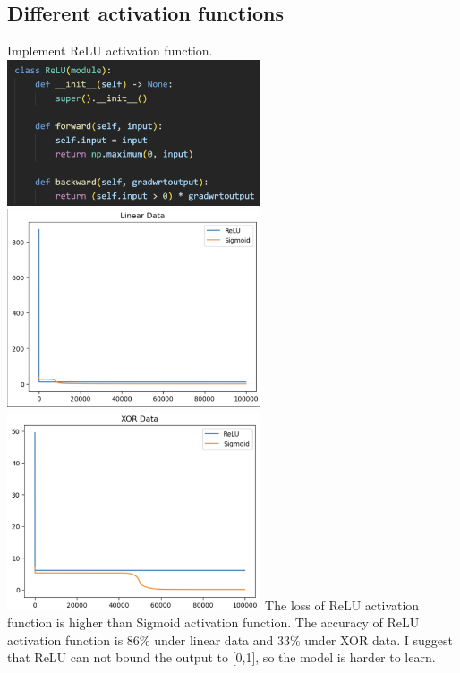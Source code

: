 \documentclass{article} %
\begin{document}
    \subsection{Different activation functions}
    Implement ReLU activation function. \\
    \includegraphics[width=7.5cm]{./imgs/relu.png} \\
    \includegraphics[width=7.5cm]{./imgs/linear_relu_loss.png}
    \includegraphics[width=7.5cm]{./imgs/xor_relu_loss.png}
    The loss of ReLU activation function is higher than Sigmoid activation function. 
    The accuracy of ReLU activation function is 86\% under linear data and 33\% under XOR data. 
    I suggest that ReLU can not bound the output to [0,1], so the model is harder to learn. \\
    
\end{document}
